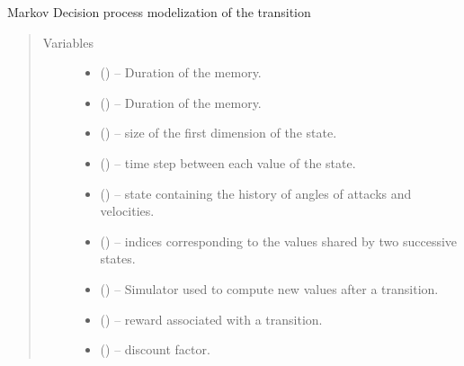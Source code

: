 \documentclass[letterpaper,10pt,english]{sphinxmanual}
\begin{document}

\begin{fulllineitems}
\label{\detokenize{package1:mdp.MDP}}
Markov Decision process modelization of the transition
\begin{quote}\begin{description}
\item[{Variables}] \leavevmode\begin{itemize}
\item {} 
 () -- Duration of the memory.

\item {} 
 () -- Duration of the memory.

\item {} 
 () -- size of the first dimension of the state.

\item {} 
 () -- time step between each value of the state.

\item {} 
 (\sphinxstyleliteralemphasis{(}\sphinxstyleliteralemphasis{)}) -- state containing the history of angles of attacks and velocities.

\item {} 
 () -- indices corresponding to the values shared by two successive states.

\item {} 
 ({\hyperref[\detokenize{package1:module-Simulator}]{}}) -- Simulator used to compute new values after a transition.

\item {} 
 () -- reward associated with a transition.

\item {} 
 () -- discount factor.


\end{itemize}
\end{description}
\end{quote}
\end{fulllineitems}
\end{document}
